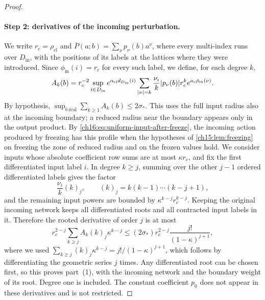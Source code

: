 \begin{proof}
\paragraph{Step 2: derivatives of the incoming perturbation.}
We write $r_c=\rho_{\mathrm{cl}}$ and $\overline P(a;b)=\sum_\nu p_\nu(b)a^\nu$, where every multi-index runs over $D_{\mathrm{in}}$, with the positions of its labels at the lattices where they were introduced. Since $\phi_{\mathrm{in}}(i)=r_c$ for every such label, we define, for each degree $k$,
\[
 A_k(b)=r_c^{-2}\sup_{i\in D_{\mathrm{in}}}
       e^{\alpha_{\mathrm{cl}}d_{D_{\mathrm{in}}}(i)}
       \sum_{|\nu|=k}\frac{\nu_i}{k}|p_\nu(b)|r_c^k
                                      e^{a_{\mathrm{cl}}\mathsf t_{\mathrm{in}}(\nu)}.
\]
By hypothesis, $\sup_{b\ \mathrm{real}}\sum_{k\ge1}A_k(b)\le2\sigma_*$. This uses the full input radius also at the incoming boundary; a reduced radius near the boundary appears only in the output product. By \eqref{ch16:eq:uniform-input-after-freeze}, the incoming action produced by freezing has this profile when the hypotheses of \cref{ch15:lem:freezing} on freezing the zone of reduced radius and on the frozen values hold. We consider inputs whose absolute coefficient row sums are at most $\kappa r_c$, and fix the first differentiated input label $i$. In degree $k\ge j$, summing over the other $j-1$ ordered differentiated labels gives the factor
\[
 \frac{\nu_i}{k}(k)_j,
 \qquad (k)_j=k(k-1)\cdots(k-j+1),
\]
and the remaining input powers are bounded by $\kappa^{k-j}r_c^{k-j}$. Keeping the original incoming network keeps all differentiated roots and all contracted input labels in it. Therefore the rooted derivative of order $j$ is at most
\[
 r_c^{2-j}\sum_{k\ge j}A_k(k)_j\kappa^{k-j}
 \le (2\sigma_*)r_c^{2-j}
                      \frac{j!}{(1-\kappa)^{j+1}},
\]
where we used $\sum_{k\ge j}(k)_j\kappa^{k-j}=j!/(1-\kappa)^{j+1}$, which follows by differentiating the geometric series $j$ times. Any differentiated root can be chosen first, so this proves part~(1), with the incoming network and the boundary weight of its root. Degree one is included. The constant coefficient $p_0$ does not appear in these derivatives and is not restricted.


\end{proof}
